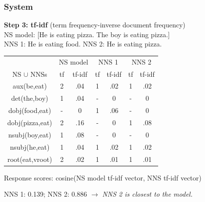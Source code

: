 \documentclass[handout,xcolor={dvipsnames}]{beamer}
\begin{document}
\begin{frame}
\frametitle{System}
\small
\textbf{Step 3: tf-idf} (term frequency-inverse document frequency) \\
\vspace{.5em}
\pause
NS model: [He is eating pizza. The boy is eating pizza.] \\ 
\vspace{.5em}
\pause
NNS 1: He is eating food. \hspace{1.4em} \pause NNS 2: He is eating pizza. \\

\pause
\vspace{-.6em}
\footnotesize
\begin{table}[htb!]
\begin{center}
\begin{tabular}{|c||c|c||c|c||c|c|}
\hline
 & \multicolumn{2}{c||}{NS model} & \multicolumn{2}{c||}{NNS 1} & \multicolumn{2}{c|}{NNS 2} \\
\cline{2-7}
NS $\cup$ NNSs & tf & tf-idf & tf & tf-idf & tf & tf-idf \\
\hline
aux(be,eat) & 2 & .04 & 1  &  .02 &  1 & .02 \\ 
\hline
det(the,boy) & 1 & .04 &  -  & 0 & - & 0 \\
\hline
dobj(food,eat) & - & 0 & 1   & .06 & - & 0 \\
\hline
dobj(pizza,eat) & 2 & .16 & -   & 0 & 1 & .08 \\
\hline
nsubj(boy,eat) & 1 & .08 & -  & 0 & - & 0 \\
\hline
nsubj(he,eat) & 1 & .04 & 1   & .02 & 1 & .02 \\
\hline
root(eat,vroot) & 2 & .02 & 1   & .01 & 1 & .01 \\ %
\hline
\end{tabular}
\end{center}
\end{table}

\vspace{.5em}

\small
Response scores: cosine(NS model tf-idf vector, NNS tf-idf vector) \\
\vspace{.5em} 

\pause
NNS 1: 0.139; \hspace{.6em} \pause NNS 2: 0.886 \pause \hspace{.6em} $\rightarrow$ \hspace{.6em} \textit{NNS 2 is closest to the model.} \\

\end{frame}
\end{document}
